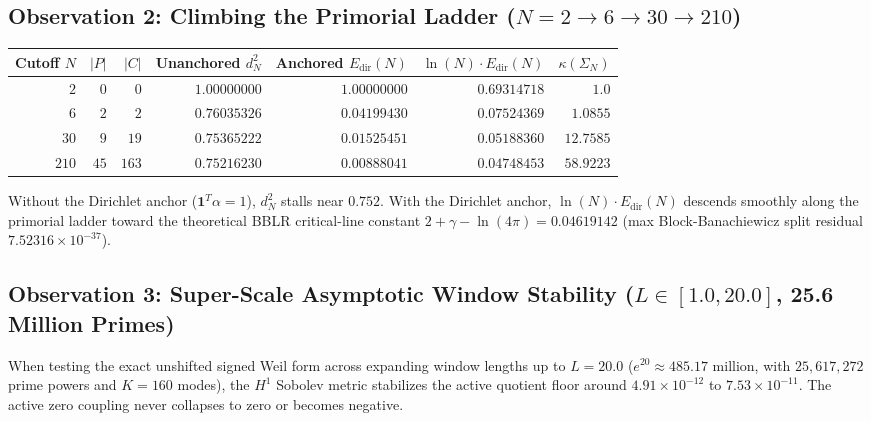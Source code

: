 \documentclass[11pt,a4paper]{article}
\begin{document}
\subsection*{Observation 2: Climbing the Primorial Ladder ($N = 2 \to 6 \to 30 \to 210$)}

\begin{table}[htbp]
\centering
\small
\begin{tabular}{@{}rrrrrrr@{}}
\toprule
Cutoff $N$ & $|P|$ & $|C|$ & Unanchored $d_N^2$ & Anchored $E_{\mathrm{dir}}(N)$ & $\ln(N)\cdot E_{\mathrm{dir}}(N)$ & $\kappa(\Sigma_N)$ \\
\midrule
$2$ & $0$ & $0$ & $1.00000000$ & $1.00000000$ & $0.69314718$ & $1.0$ \\
$6$ & $2$ & $2$ & $0.76035326$ & $0.04199430$ & $0.07524369$ & $1.0855$ \\
$30$ & $9$ & $19$ & $0.75365222$ & $0.01525451$ & $0.05188360$ & $12.7585$ \\
$210$ & $45$ & $163$ & $0.75216230$ & $0.00888041$ & $\mathbf{0.04748453}$ & $58.9223$ \\
\bottomrule
\end{tabular}
\end{table}

Without the Dirichlet anchor ($\mathbf{1}^T\alpha = 1$), $d_N^2$ stalls near $0.752$. With the Dirichlet anchor, $\ln(N)\cdot E_{\mathrm{dir}}(N)$ descends smoothly along the primorial ladder toward the theoretical BBLR critical-line constant $2 + \gamma - \ln(4\pi) = 0.04619142$ (max Block-Banachiewicz split residual $7.52316\times 10^{-37}$).

\subsection*{Observation 3: Super-Scale Asymptotic Window Stability ($L \in [1.0, 20.0]$, 25.6 Million Primes)}
When testing the exact unshifted signed Weil form across expanding window lengths up to $L = 20.0$ ($e^{20} \approx 485.17$ million, with $25,617,272$ prime powers and $K = 160$ modes), the $H^1$ Sobolev metric stabilizes the active quotient floor around $4.91 \times 10^{-12}$ to $7.53 \times 10^{-11}$. The active zero coupling never collapses to zero or becomes negative.
\end{document}
